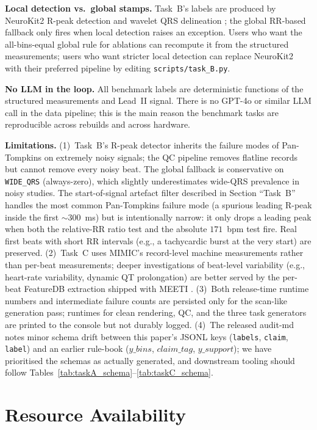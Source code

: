\documentclass[12pt,letterpaper]{article}
\begin{document}
\textbf{Local detection vs.\ global stamps.} Task~B's labels are produced by NeuroKit2 \cite{makowski2021neurokit2} R-peak detection \cite{pan1985realtime} and wavelet QRS delineation \cite{martinez2004wavelet}; the global RR-based fallback only fires when local detection raises an exception. Users who want the all-bins-equal global rule for ablations can recompute it from the structured measurements; users who want stricter local detection can replace NeuroKit2 with their preferred pipeline by editing \texttt{scripts/task\_B.py}.

\textbf{No LLM in the loop.} All benchmark labels are deterministic functions of the structured measurements and Lead~II signal. There is no GPT-4o or similar LLM call in the data pipeline; this is the main reason the benchmark tasks are reproducible across rebuilds and across hardware.

\textbf{Limitations.} (1)~Task~B's R-peak detector inherits the failure modes of Pan-Tompkins on extremely noisy signals; the QC pipeline removes flatline records but cannot remove every noisy beat. The global fallback is conservative on \texttt{WIDE\_QRS} (always-zero), which slightly underestimates wide-QRS prevalence in noisy studies. The start-of-signal artefact filter described in Section ``Task~B'' handles the most common Pan-Tompkins failure mode (a spurious leading R-peak inside the first $\sim$300~ms) but is intentionally narrow: it only drops a leading peak when both the relative-RR ratio test and the absolute $171$~bpm test fire. Real first beats with short RR intervals (e.g., a tachycardic burst at the very start) are preserved. (2)~Task~C uses MIMIC's record-level machine measurements rather than per-beat measurements; deeper investigations of beat-level variability (e.g., heart-rate variability, dynamic QT prolongation) are better served by the per-beat FeatureDB extraction shipped with MEETI \cite{zhang2024meeti}. (3)~Both release-time runtime numbers and intermediate failure counts are persisted only for the scan-like generation pass; runtimes for clean rendering, QC, and the three task generators are printed to the console but not durably logged. (4)~The released audit-md notes minor schema drift between this paper's JSONL keys (\texttt{labels}, \texttt{claim}, \texttt{label}) and an earlier rule-book ($y\_bins$, $claim\_tag$, $y\_support$); we have prioritised the schemas as actually generated, and downstream tooling should follow Tables~\ref{tab:taskA_schema}--\ref{tab:taskC_schema}.

\section*{Resource Availability}
\end{document}
